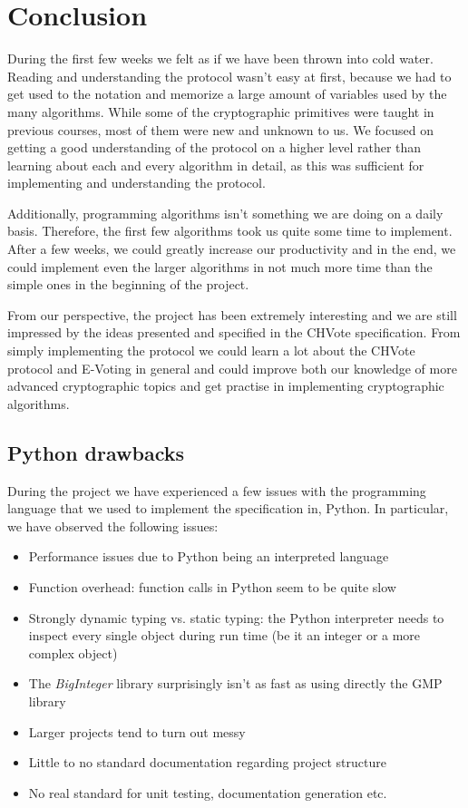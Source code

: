 \documentclass[a4paper,12pt]{report}
\begin{document}
\chapter{Conclusion}
During the first few weeks we felt as if we have been thrown into cold water. Reading and understanding the protocol wasn't easy at first, because we had to get used to the notation and memorize a large amount of variables used by the many algorithms. While some of the cryptographic primitives were taught in previous courses, most of them were new and unknown to us. We focused on getting a good understanding of the protocol on a higher level rather than learning about each and every algorithm in detail, as this was sufficient for implementing and understanding the protocol.

Additionally, programming algorithms isn't something we are doing on a daily basis. Therefore, the first few algorithms took us quite some time to implement. After a few weeks, we could greatly increase our productivity and in the end, we could implement even the larger algorithms in not much more time than the simple ones in the beginning of the project.

From our perspective, the project has been extremely interesting and we are still impressed by the ideas presented and specified in the CHVote specification. From simply implementing the protocol we could learn a lot about the CHVote protocol and E-Voting in general and could improve both our knowledge of more advanced cryptographic topics and get practise in implementing cryptographic algorithms.
\section{Python drawbacks}

During the project we have experienced a few issues with the programming language that we used to implement the specification in, Python. In particular, we have observed the following issues:

\begin{itemize}
	\item Performance issues due to Python being an interpreted language
	\item Function overhead: function calls in Python seem to be quite slow
	\item Strongly dynamic typing vs. static typing: the Python interpreter needs to inspect every single object during run time (be it an integer or a more complex object)
	\item The \textit{BigInteger} library surprisingly isn't as fast as using directly the GMP library
	\item Larger projects tend to turn out messy
	\item Little to no standard documentation regarding project structure
	\item No real standard for unit testing, documentation generation etc.
\end{itemize}
\end{document}
